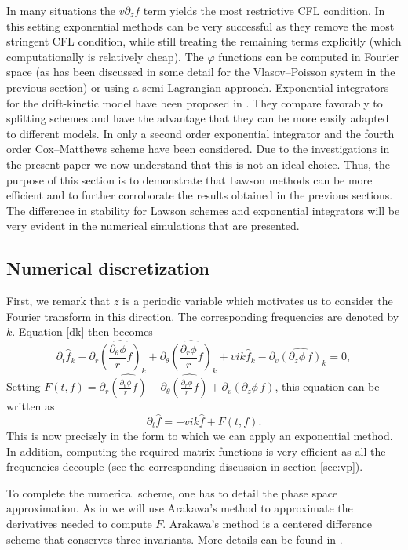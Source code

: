 In many situations the $v \partial_z f$ term yields the most restrictive CFL condition. In this setting exponential methods can be very successful as they remove the most stringent CFL condition, while still treating the remaining terms explicitly (which computationally is relatively cheap). The $\varphi$ functions can be computed in Fourier space (as has been discussed in some detail for the Vlasov--Poisson system in the previous section) or using a semi-Lagrangian approach. Exponential integrators for the drift-kinetic model have been proposed in \cite{Crouseilles:2018}. They compare favorably to splitting schemes and have the advantage that they can be more easily adapted to different models. In \cite{Crouseilles:2018} only a second order exponential integrator and the fourth order Cox--Matthews scheme have been considered. Due to the investigations in the present paper we now understand that this is not an ideal choice. Thus, the purpose of this section is to demonstrate that Lawson methods can be more efficient and to further corroborate the results obtained in the previous sections. The difference in stability for Lawson schemes and exponential integrators will be very evident in the numerical simulations that are presented.

\subsection{Numerical discretization}

First, we remark that $z$ is a periodic variable which motivates us to consider the Fourier transform in this direction. The corresponding frequencies are denoted by $k$. Equation \eqref{dk} then becomes
$$
\partial_t \hat{f}_k -\partial_r \widehat{\left(\frac{\partial_\theta \phi}{r}f\right)}_k+\partial_\theta \widehat{\left(\frac{\partial_r \phi}{r} f\right)}_k +vik \hat{f}_k-\partial_v\widehat{\left( \partial_z\phi \, f\right)}_k=0, 
$$
Setting $F(t, f)= \partial_r \widehat{\left(\frac{\partial_\theta \phi}{r}f\right)}-\partial_\theta \widehat{\left(\frac{\partial_r \phi}{r} f\right)} +\partial_v\widehat{\left( \partial_z\phi \,f\right)}$, this equation can be written as
$$
\partial_t \hat{f} = - vik \hat{f} + F(t, f). 
$$
This is now precisely in the form to which we can apply an exponential method. In addition, computing the required matrix functions is very efficient as all the frequencies decouple (see the corresponding discussion in section \ref{sec:vp}).

To complete the numerical scheme, one has to detail the phase space approximation. As in \cite{Crouseilles:2018} we will use Arakawa's method to approximate the derivatives needed to compute $F$. Arakawa's method is a centered difference scheme that conserves three invariants. More details can be found in \cite{Crouseilles:2018}.


